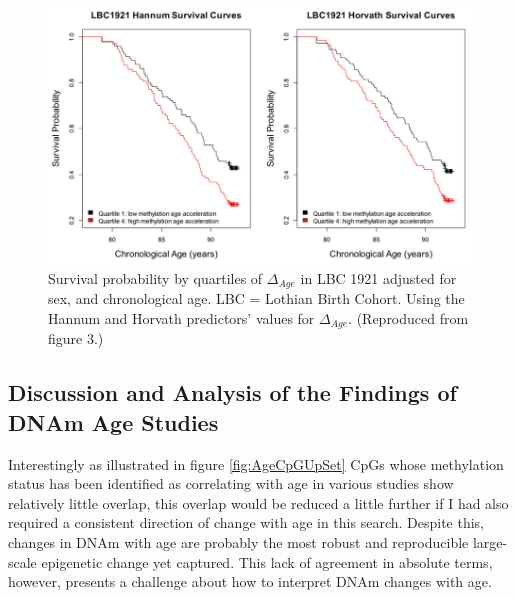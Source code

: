 \documentclass[]{book}
\begin{document}
\begin{figure}
\includegraphics[width=12.47in]{figs/Marioni2015f3} \caption{Survival probability by quartiles of \(\Delta_{Age}\) in LBC 1921 adjusted for sex, and chronological age. LBC = Lothian Birth Cohort. Using the Hannum and Horvath predictors' values for \(\Delta_{Age}\).
(Reproduced from \citet{Marioni2015} figure 3.)}\label{fig:Marioni2015f3}
\end{figure}




\hypertarget{discussion-and-analysis-of-the-findings-of-dnam-age-studies}{%
\subsection{Discussion and Analysis of the Findings of DNAm Age Studies}\label{discussion-and-analysis-of-the-findings-of-dnam-age-studies}}

Interestingly as illustrated in figure \ref{fig:AgeCpGUpSet} CpGs whose methylation status has been identified as correlating with age in various studies show relatively little overlap, this overlap would be reduced a little further if I had also required a consistent direction of change with age in this search. Despite this, changes in DNAm with age are probably the most robust and reproducible large-scale epigenetic change yet captured. This lack of agreement in absolute terms, however, presents a challenge about how to interpret DNAm changes with age.
\end{document}
